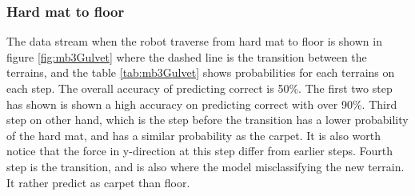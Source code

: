 \documentclass[USenglish]{ifimaster}  %
\begin{document}
	
	\begin{table}[h]
		\centering
		\caption{The table showing probability of each terrain per step from floor to carpet. Marked green represent correct prediction and correct terrain, red represent wrong prediction and yellow is the correct prediction if it got wrong.}
		\label{tab:Gulvet4teppe}
	\end{table}
	\FloatBarrier
	\clearpage
	
\subsubsection{Hard mat to floor} \label{subsec:hmf}
The data stream when the robot traverse from hard mat to floor is shown in figure \ref{fig:mb3Gulvet}  where the dashed line is the transition between the terrains, and the table \ref{tab:mb3Gulvet} shows probabilities for each terrains on each step. The overall accuracy of predicting correct is 50\%. The first two step has shown is shown a high accuracy on predicting correct with over 90\%. Third step on other hand, which is the step before the transition has a lower probability of the hard mat, and has a similar probability as the carpet. It is also worth notice that the force in y-direction at this step differ from earlier steps. Fourth step is the transition, and is also where the model misclassifying the new terrain. It rather predict as carpet than floor. 
		
\end{document}
